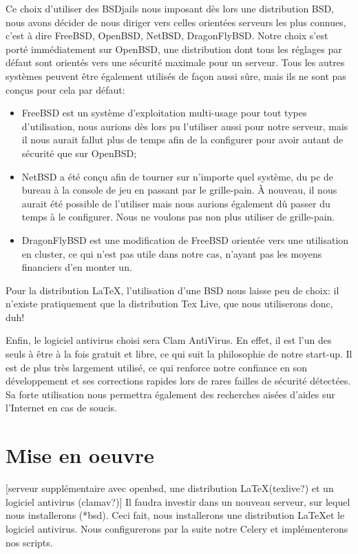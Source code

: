 \documentclass[10pt,a4paper]{article}
\begin{document}
Ce choix d'utiliser des BSDjails nous imposant dès lors une distribution BSD, nous avons décider de nous diriger vers celles orientées serveurs les plus connues,
c'est à dire FreeBSD, OpenBSD, NetBSD, DragonFlyBSD.
Notre choix s'est porté immédiatement sur OpenBSD, une distribution dont tous les réglages par défaut sont orientés vers une sécurité maximale pour un serveur.
Tous les autres systèmes peuvent être également utilisés de façon aussi sûre, mais ils ne sont pas conçus pour cela par défaut:
\begin{itemize}
    \item FreeBSD est un système d'exploitation multi-usage pour tout types d'utilisation, nous aurions dès lors pu l'utiliser aussi pour notre serveur, mais il nous aurait fallut plus de temps afin de la configurer pour avoir autant de sécurité que sur OpenBSD;
    \item NetBSD a été conçu afin de tourner sur n'importe quel système, du pc de bureau à la console de jeu en passant par le grille-pain. À nouveau, il nous aurait été possible de l'utiliser mais nous aurions également dû passer du temps à le configurer. Nous ne voulons pas non plus utiliser de grille-pain.
    \item DragonFlyBSD est une modification de FreeBSD orientée vers une utilisation en cluster, ce qui n'est pas utile dans notre cas, n'ayant pas les moyens financiers d'en monter un.
\end{itemize}

Pour la distribution \LaTeX, l'utilisation d'une BSD nous laisse peu de choix: il n'existe pratiquement que la distribution Tex Live, que nous utiliserons donc, duh! %

Enfin, le logiciel antivirus choisi sera Clam AntiVirus.
En effet, il est l'un des seuls à être à la fois gratuit et libre, ce qui suit la philosophie de notre start-up.
Il est de plus très largement utilisé, ce qui renforce notre confiance en son développement et ses corrections rapides lors de rares failles de sécurité détectées.
Sa forte utilisation nous permettra également des recherches aisées d'aides sur l'Internet en cas de soucis.

\section{Mise en oeuvre}
[serveur supplémentaire avec openbsd, une distribution \LaTeX (texlive?) et un logiciel antivirus (clamav?)]
Il faudra investir dans un nouveau serveur, sur lequel nous installerons (*bsd).
Ceci fait, nous installerons une distribution \LaTeX et le logiciel antivirus.
Nous configurerons par la suite notre Celery et implémenterons nos scripts.
\end{document}
